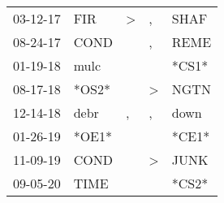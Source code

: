 \begin{supertabular}{p{0.07\textwidth}p{0.06\textwidth}p{0.02\textwidth}p{0.02\textwidth}p{0.06\textwidth}}
          03-12-17\textsuperscript{} &            FIR\textsuperscript{} &     \textgreater &                , &          SHAF\textsuperscript{} \\
          08-24-17\textsuperscript{} &           COND\textsuperscript{} &                  &                , &          REME\textsuperscript{} \\
          01-19-18\textsuperscript{} &           mulc\textsuperscript{} &                  &                  &                           *CS1* \\
          08-17-18\textsuperscript{} &                            *OS2* &                  &     \textgreater &          NGTN\textsuperscript{} \\
          12-14-18\textsuperscript{} &           debr\textsuperscript{} &                , &                , &          down\textsuperscript{} \\
          01-26-19\textsuperscript{} &                            *OE1* &                  &                  &                           *CE1* \\
          11-09-19\textsuperscript{} &           COND\textsuperscript{} &                  &     \textgreater &          JUNK\textsuperscript{} \\
          09-05-20\textsuperscript{} &           TIME\textsuperscript{} &                  &                  &                           *CS2* \\
\end{supertabular}

